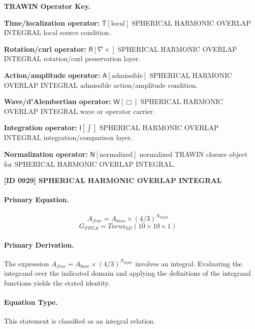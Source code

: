 \par\vspace{0.45\baselineskip}
\noindent\begin{minipage}[t]{\linewidth}
\begingroup
\small
\raggedright
\textbf{TRAWIN Operator Key.}\par
\noindent\textbf{Time/localization operator:} $\mathsf{T}\!\left[\mathrm{local}\right]$ SPHERICAL HARMONIC OVERLAP INTEGRAL local source condition.\par
\noindent\textbf{Rotation/curl operator:} $\mathsf{R}\!\left[\nabla\times\right]$ SPHERICAL HARMONIC OVERLAP INTEGRAL rotation/curl preservation layer.\par
\noindent\textbf{Action/amplitude operator:} $\mathsf{A}\!\left[\mathrm{admissible}\right]$ SPHERICAL HARMONIC OVERLAP INTEGRAL admissible action/amplitude condition.\par
\noindent\textbf{Wave/d'Alembertian operator:} $\mathsf{W}\!\left[\Box\right]$ SPHERICAL HARMONIC OVERLAP INTEGRAL wave or operator carrier.\par
\noindent\textbf{Integration operator:} $\mathsf{I}\!\left[\int\right]$ SPHERICAL HARMONIC OVERLAP INTEGRAL integration/comparison layer.\par
\noindent\textbf{Normalization operator:} $\mathsf{N}\!\left[\mathrm{normalized}\right]$ normalized TRAWIN closure object for SPHERICAL HARMONIC OVERLAP INTEGRAL.\par
\endgroup
\end{minipage}

\clearpage
\noindent\textbf{[ID 0929] SPHERICAL HARMONIC OVERLAP INTEGRAL}\par
\vspace{0.35em}
\paragraph{Primary Equation.}
\[
A_{frac} = A_{base} \times (4/3)^{N_{depth}}
\]
\[
G_{FPGA} = Torus_{3D}(10 \times 10 \times 1)
\]

\paragraph{Primary Derivation.}
The expression \( A_{frac} = A_{base} \times (4/3)^{N_{depth}} \) involves an integral. Evaluating the integrand over the indicated domain and applying the definitions of the integrand functions yields the stated identity.
\paragraph{Equation Type.}
This statement is classified as an integral relation.

